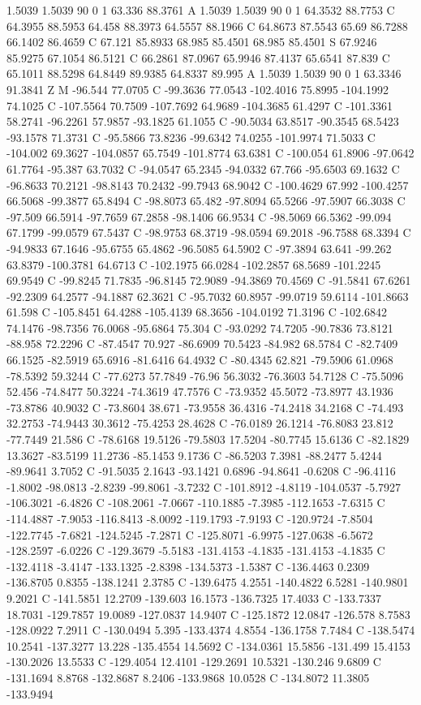 {{{1.5039 1.5039 90 0 1 63.336 88.3761 A 1.5039 1.5039 90 0 1 64.3532 88.7753 C 64.3955 88.5953 64.458 88.3973 64.5557 88.1966 C 64.8673 87.5543 65.69 86.7288 66.1402 86.4659 C 67.121 85.8933 68.985 85.4501 68.985 85.4501 S 67.9246 85.9275 67.1054 86.5121 C 66.2861 87.0967 65.9946 87.4137 65.6541 87.839 C 65.1011 88.5298 64.8449 89.9385 64.8337 89.995 A 1.5039 1.5039 90 0 1 63.3346 91.3841 Z M -96.544 77.0705 C -99.3636 77.0543 -102.4016 75.8995 -104.1992 74.1025 C -107.5564 70.7509 -107.7692 64.9689 -104.3685 61.4297 C -101.3361 58.2741 -96.2261 57.9857 -93.1825 61.1055 C -90.5034 63.8517 -90.3545 68.5423 -93.1578 71.3731 C -95.5866 73.8236 -99.6342 74.0255 -101.9974 71.5033 C -104.002 69.3627 -104.0857 65.7549 -101.8774 63.6381 C -100.054 61.8906 -97.0642 61.7764 -95.387 63.7032 C -94.0547 65.2345 -94.0332 67.766 -95.6503 69.1632 C -96.8633 70.2121 -98.8143 70.2432 -99.7943 68.9042 C -100.4629 67.992 -100.4257 66.5068 -99.3877 65.8494 C -98.8073 65.482 -97.8094 65.5266 -97.5907 66.3038 C -97.509 66.5914 -97.7659 67.2858 -98.1406 66.9534 C -98.5069 66.5362 -99.094 67.1799 -99.0579 67.5437 C -98.9753 68.3719 -98.0594 69.2018 -96.7588 68.3394 C -94.9833 67.1646 -95.6755 65.4862 -96.5085 64.5902 C -97.3894 63.641 -99.262 63.8379 -100.3781 64.6713 C -102.1975 66.0284 -102.2857 68.5689 -101.2245 69.9549 C -99.8245 71.7835 -96.8145 72.9089 -94.3869 70.4569 C -91.5841 67.6261 -92.2309 64.2577 -94.1887 62.3621 C -95.7032 60.8957 -99.0719 59.6114 -101.8663 61.598 C -105.8451 64.4288 -105.4139 68.3656 -104.0192 71.3196 C -102.6842 74.1476 -98.7356 76.0068 -95.6864 75.304 C -93.0292 74.7205 -90.7836 73.8121 -88.958 72.2296 C -87.4547 70.927 -86.6909 70.5423 -84.982 68.5784 C -82.7409 66.1525 -82.5919 65.6916 -81.6416 64.4932 C -80.4345 62.821 -79.5906 61.0968 -78.5392 59.3244 C -77.6273 57.7849 -76.96 56.3032 -76.3603 54.7128 C -75.5096 52.456 -74.8477 50.3224 -74.3619 47.7576 C -73.9352 45.5072 -73.8977 43.1936 -73.8786 40.9032 C -73.8604 38.671 -73.9558 36.4316 -74.2418 34.2168 C -74.493 32.2753 -74.9443 30.3612 -75.4253 28.4628 C -76.0189 26.1214 -76.8083 23.812 -77.7449 21.586 C -78.6168 19.5126 -79.5803 17.5204 -80.7745 15.6136 C -82.1829 13.3627 -83.5199 11.2736 -85.1453 9.1736 C -86.5203 7.3981 -88.2477 5.4244 -89.9641 3.7052 C -91.5035 2.1643 -93.1421 0.6896 -94.8641 -0.6208 C -96.4116 -1.8002 -98.0813 -2.8239 -99.8061 -3.7232 C -101.8912 -4.8119 -104.0537 -5.7927 -106.3021 -6.4826 C -108.2061 -7.0667 -110.1885 -7.3985 -112.1653 -7.6315 C -114.4887 -7.9053 -116.8413 -8.0092 -119.1793 -7.9193 C -120.9724 -7.8504 -122.7745 -7.6821 -124.5245 -7.2871 C -125.8071 -6.9975 -127.0638 -6.5672 -128.2597 -6.0226 C -129.3679 -5.5183 -131.4153 -4.1835 -131.4153 -4.1835 C -132.4118 -3.4147 -133.1325 -2.8398 -134.5373 -1.5387 C -136.4463 0.2309 -136.8705 0.8355 -138.1241 2.3785 C -139.6475 4.2551 -140.4822 6.5281 -140.9801 9.2021 C -141.5851 12.2709 -139.603 16.1573 -136.7325 17.4033 C -133.7337 18.7031 -129.7857 19.0089 -127.0837 14.9407 C -125.1872 12.0847 -126.578 8.7583 -128.0922 7.2911 C -130.0494 5.395 -133.4374 4.8554 -136.1758 7.7484 C -138.5474 10.2541 -137.3277 13.228 -135.4554 14.5692 C -134.0361 15.5856 -131.499 15.4153 -130.2026 13.5533 C -129.4054 12.4101 -129.2691 10.5321 -130.246 9.6809 C -131.1694 8.8768 -132.8687 8.2406 -133.9868 10.0528 C -134.8072 11.3805 -133.9494 }}}
